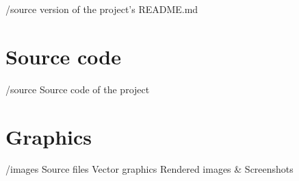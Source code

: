 \begin{FileList}{/source}
   \latex version of the project's README.md
\end{FileList}


\section{Source code}
\begin{FileList}{/source}
   Source code of the project
\end{FileList}


\section{Graphics}
\begin{FileList}{/images}
   Source files
   Vector graphics
   Rendered images \& Screenshots
\end{FileList}
